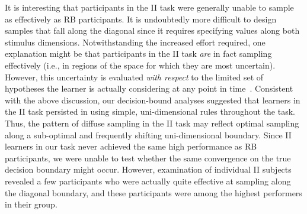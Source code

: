 \documentclass[3p,twocolumn,authoryear,10pt]{elsarticle}
\begin{document}
It is interesting that participants in the II task were generally unable to sample as effectively as RB participants. It is undoubtedly more difficult to design samples that fall along the diagonal since it requires specifying values along both stimulus dimensions. Notwithstanding the increased effort required, one explanation might be that participants in the II task \textit{are} in fact sampling effectively (i.e., in regions of the space for which they are most uncertain). However, this uncertainty is evaluated \textit{with respect} to the limited set of hypotheses the learner is actually considering at any point in time~\citep{Bonawitz:2010fk}. Consistent with the above discussion, our decision-bound analyses suggested that learners in the II task persisted in using simple, uni-dimensional rules throughout the task. Thus, the pattern of diffuse sampling in the II task may reflect optimal sampling along a sub-optimal and frequently shifting uni-dimensional boundary. Since II learners in our task never achieved the same high performance as RB participants, we were unable to test whether the same convergence on the true decision boundary might occur. However, examination of individual II subjects revealed a few participants who were actually quite effective at sampling along the diagonal boundary, and these participants were among the highest performers in their group. 
\end{document}
